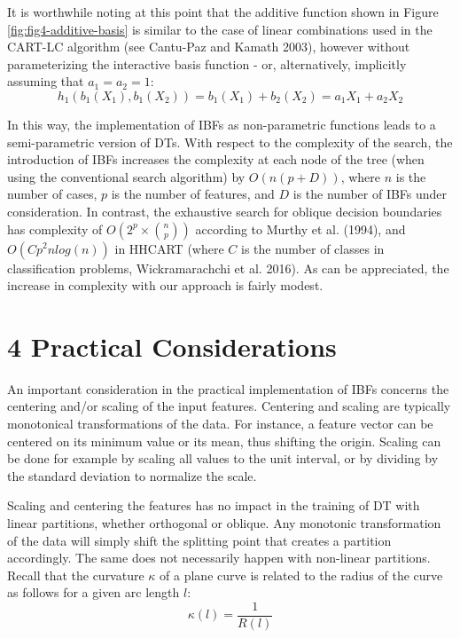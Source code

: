 \documentclass[]{elsarticle} %
\begin{document}
It is worthwhile noting at this point that the additive function shown
in Figure \ref{fig:fig4-additive-basis} is similar to the case of linear
combinations used in the CART-LC algorithm (see Cantu-Paz and Kamath
2003), however without parameterizing the interactive basis function -
or, alternatively, implicitly assuming that \(a_1=a_2=1\): \[
h_1(b_1(X_1),b_1(X_2))=b_1(X_1)+b_2(X_2)=a_1X_1+a_2X_2
\]

In this way, the implementation of IBFs as non-parametric functions
leads to a semi-parametric version of DTs. With respect to the
complexity of the search, the introduction of IBFs increases the
complexity at each node of the tree (when using the conventional search
algorithm) by \(O(n(p+D))\), where \(n\) is the number of cases, \(p\)
is the number of features, and \(D\) is the number of IBFs under
consideration. In contrast, the exhaustive search for oblique decision
boundaries has complexity of \(O(2^p \times{n\choose{p}})\) according to
Murthy et al. (1994), and \(O(Cp^2nlog(n))\) in HHCART (where \(C\) is
the number of classes in classification problems, Wickramarachchi et al.
2016). As can be appreciated, the increase in complexity with our
approach is fairly modest.

\section{4 Practical Considerations}\label{practical-considerations}

An important consideration in the practical implementation of IBFs
concerns the centering and/or scaling of the input features. Centering
and scaling are typically monotonical transformations of the data. For
instance, a feature vector can be centered on its minimum value or its
mean, thus shifting the origin. Scaling can be done for example by
scaling all values to the unit interval, or by dividing by the standard
deviation to normalize the scale.

Scaling and centering the features has no impact in the training of DT
with linear partitions, whether orthogonal or oblique. Any monotonic
transformation of the data will simply shift the splitting point that
creates a partition accordingly. The same does not necessarily happen
with non-linear partitions. Recall that the curvature \(\kappa\) of a
plane curve is related to the radius of the curve as follows for a given
arc length \(l\): \[
\kappa(l)=\frac{1}{R(l)}
\]
\end{document}
